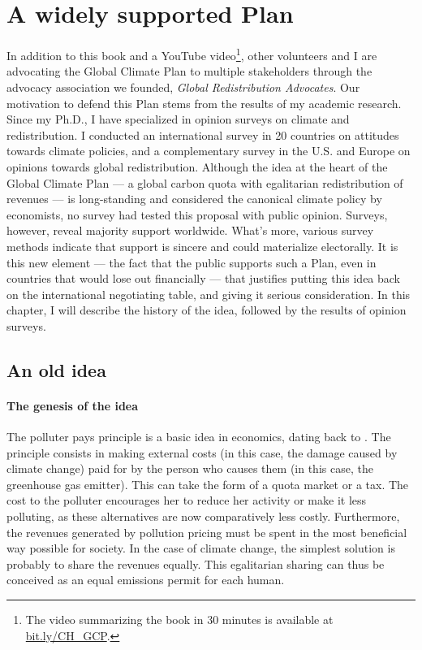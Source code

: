 \documentclass[a5paper,english,openany]{memoir}
\begin{document}
\chapter{A widely supported Plan\label{ch:soutien}}

In addition to this book and a YouTube video\footnote{The video summarizing the book in 30 minutes is available at \href{https://bit.ly/CH_GCP}{bit.ly/CH\_GCP}.}, other volunteers and I are advocating the Global Climate Plan to multiple stakeholders through the advocacy association we founded, \textit{Global Redistribution Advocates}. %
Our motivation to defend this Plan stems from the results of my academic research. Since my Ph.D., I have specialized in opinion surveys on climate and redistribution. I conducted an international survey in 20 countries on attitudes towards climate policies, and a complementary survey in the U.S. and Europe on opinions towards global redistribution. Although the idea at the heart of the Global Climate Plan --- a global carbon quota with egalitarian redistribution of revenues --- is long-standing and considered the canonical climate policy by economists, no survey had tested this proposal with public opinion. Surveys, however, reveal majority support worldwide. What's more, various survey methods indicate that support is sincere and could materialize electorally. 
It is this new element --- the fact that the public supports such a Plan, even in countries that would lose out financially --- that justifies putting this idea back on the international negotiating table, and giving it serious consideration. In this chapter, I will describe the history of the idea, followed by the results of opinion surveys.


\section{An old idea} 

\subsubsection{The genesis of the idea}
The polluter pays principle is a basic idea in economics, dating back to \citet{pigou_economics_1920}. The principle consists in making external costs (in this case, the damage caused by climate change) paid for by the person who causes them (in this case, the greenhouse gas emitter). This can take the form of a quota market or a tax. The cost to the polluter encourages her to reduce her activity or make it less polluting, as these alternatives are now comparatively less costly. %
Furthermore, the revenues generated by pollution pricing must be spent in the most beneficial way possible for society.  
In the case of climate change, the simplest solution is probably to share the revenues equally. This egalitarian sharing can thus be conceived as an equal emissions permit for each human. 
\end{document}
